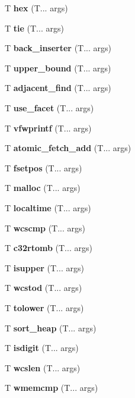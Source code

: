 \begin{DoxyCompactItemize}
\mbox{\label{hex}} 
T \textbf{ hex} (T... args)
\item 
\mbox{\label{tie}} 
T \textbf{ tie} (T... args)
\item 
\mbox{\label{back_inserter}} 
T \textbf{ back\+\_\+inserter} (T... args)
\item 
\mbox{\label{upper_bound}} 
T \textbf{ upper\+\_\+bound} (T... args)
\item 
\mbox{\label{adjacent_find}} 
T \textbf{ adjacent\+\_\+find} (T... args)
\item 
\mbox{\label{use_facet}} 
T \textbf{ use\+\_\+facet} (T... args)
\item 
\mbox{\label{vfwprintf}} 
T \textbf{ vfwprintf} (T... args)
\item 
\mbox{\label{atomic_fetch_add}} 
T \textbf{ atomic\+\_\+fetch\+\_\+add} (T... args)
\item 
\mbox{\label{fsetpos}} 
T \textbf{ fsetpos} (T... args)
\item 
\mbox{\label{malloc}} 
T \textbf{ malloc} (T... args)
\item 
\mbox{\label{localtime}} 
T \textbf{ localtime} (T... args)
\item 
\mbox{\label{wcscmp}} 
T \textbf{ wcscmp} (T... args)
\item 
\mbox{\label{c32rtomb}} 
T \textbf{ c32rtomb} (T... args)
\item 
\mbox{\label{isupper}} 
T \textbf{ isupper} (T... args)
\item 
\mbox{\label{wcstof}} 
T \textbf{ wcstod} (T... args)
\item 
\mbox{\label{tolower}} 
T \textbf{ tolower} (T... args)
\item 
\mbox{\label{sort_heap}} 
T \textbf{ sort\+\_\+heap} (T... args)
\item 
\mbox{\label{isdigit}} 
T \textbf{ isdigit} (T... args)
\item 
\mbox{\label{wcslen}} 
T \textbf{ wcslen} (T... args)
\item 
\mbox{\label{wmemcmp}} 
T \textbf{ wmemcmp} (T... args)
\item 
\mbox{\label{move_if_noexcept}} 

\end{DoxyCompactItemize}
